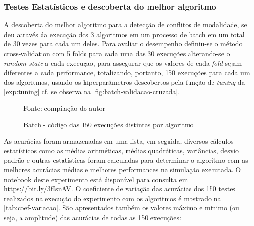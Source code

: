 \subsubsection{Testes Estatísticos e descoberta do melhor algoritmo}\label{teste-estatistico}
A descoberta do melhor algoritmo para a detecção de conflitos de modalidade, se deu através da execução dos 3 algoritmos em um processo de batch em um total de 30 vezes para cada um deles. Para avaliar o desempenho definiu-se o método cross-validation com 5 folds para cada uma das 30 execuções alterando-se o \textit{random state} a cada execução, para assegurar que os valores de cada \textit{fold} sejam diferentes a cada performance, totalizando, portanto, 150 execuções para cada um dos algoritmos, usando os hiperparâmetros descobertos pela função de \textit{tuning} da \autoref{exp:tuning} cf. se observa na \autoref{fig:batch-validacao-cruzada}.
\begin{figure}[h!]
	\centering
	\caption{Batch - código das 150 execuções distintas por algoritmo}
	
	\label{fig:batch-validacao-cruzada}
	{\scriptsize Fonte: compilação do autor}
\end{figure}

As acurácias foram armazenadas em uma lista, em seguida, diversos cálculos estatísticos como as médias aritméticas, médias quadráticas, variâncias, desvio padrão e outras estatísticas foram calculadas para determinar o algoritmo com as melhores acurácias médias e melhores performances na simulação executada. O notebook deste experimento está disponível para consulta em \url{https://bit.ly/3fIsnAV}.
O coeficiente de variação das acurácias dos 150 testes realizados na execução do experimento com os algoritmos é mostrado na \autoref{tab:coef-variacao}. São apresentados também os valores máximo e mínimo (ou seja, a amplitude) das acurácias de todas as 150 execuções:

